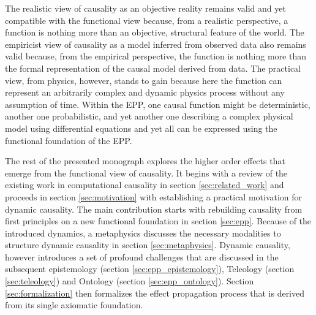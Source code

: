 The realistic view of causality as an objective reality remains valid and yet compatible with the functional view because, from
a realistic perspective, a function is nothing more than an objective, structural feature of the world. 
The empiricist view of causality as a model inferred from observed data also remains valid because, from the empirical perspective, the function is nothing more than the formal representation of the causal model derived from data.
The practical view, from physics, however, stands to gain because here the function can represent an arbitrarily complex and dynamic physics process without any assumption of time. Within the EPP, one causal function might be deterministic, another one probabilistic, and yet another one describing a complex physical model using differential equations and yet all can be expressed using the functional foundation of the EPP. 

The rest of the presented monograph explores the higher order effects that emerge from the functional view of causality. It begins with a review of the existing work in computational causality in section \ref{sec:related_work} and proceeds in section \ref{sec:motivation} with establishing a practical motivation for dynamic causality. The main contribution starts with rebuilding causality from first principles on a new functional foundation in section \ref{sec:epp}. Because of the introduced dynamics, a metaphysics discusses the necessary modalities to structure dynamic causality in section \ref{sec:metaphysics}. Dynamic causality, however introduces a set of profound challenges that are discussed in the subsequent epistemology (section \ref{sec:epp_epistemology}), Teleology (section \ref{sec:teleology}) and Ontology (section \ref{sec:epp_ontology}). Section \ref{sec:formalization} then formalizes the effect propagation process that is derived from its single axiomatic foundation. 

\newpage
